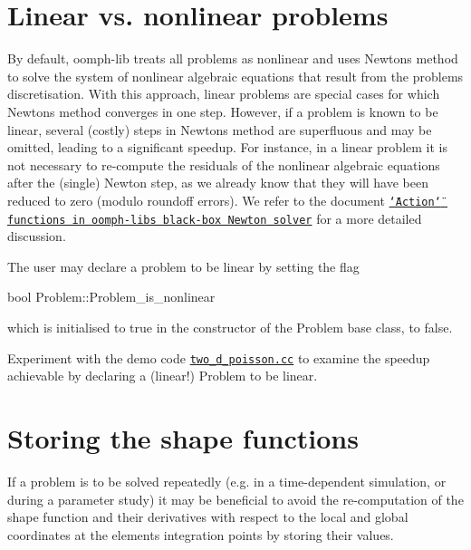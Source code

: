  

\hypertarget{index_linear_vs_nonlinear}{}\section{Linear vs. nonlinear problems}\label{index_linear_vs_nonlinear}
By default, {\ttfamily oomph-\/lib} treats all problems as nonlinear and uses Newton\textquotesingle{}s method to solve the system of nonlinear algebraic equations that result from the problem\textquotesingle{}s discretisation. With this approach, linear problems are special cases for which Newton\textquotesingle{}s method converges in one step. However, if a problem is known to be linear, several (costly) steps in Newton\textquotesingle{}s method are superfluous and may be omitted, leading to a significant speedup. For instance, in a linear problem it is not necessary to re-\/compute the residuals of the nonlinear algebraic equations after the (single) Newton step, as we already know that they will have been reduced to zero (modulo roundoff errors). We refer to the document \href{../../order_of_action_functions/html/index.html}{\tt \char`\"{}\+Action\char`\"{} functions in oomph-\/lib\textquotesingle{}s black-\/box Newton solver} for a more detailed discussion.

The user may declare a problem to be linear by setting the flag 
\begin{DoxyCode}
\textcolor{keywordtype}{bool} Problem::Problem\_is\_nonlinear
\end{DoxyCode}
 which is initialised to {\ttfamily true} in the constructor of the {\ttfamily Problem} base class, to {\ttfamily false}.

Experiment with the demo code \href{../../../demo_drivers/optimisation/linear_vs_nonlinear/two_d_poisson.cc}{\tt two\+\_\+d\+\_\+poisson.\+cc} to examine the speedup achievable by declaring a (linear!) Problem to be linear.



 

\hypertarget{index_store_shape}{}\section{Storing the shape functions}\label{index_store_shape}
If a problem is to be solved repeatedly (e.\+g. in a time-\/dependent simulation, or during a parameter study) it may be beneficial to avoid the re-\/computation of the shape function and their derivatives with respect to the local and global coordinates at the elements\textquotesingle{} integration points by storing their values.

